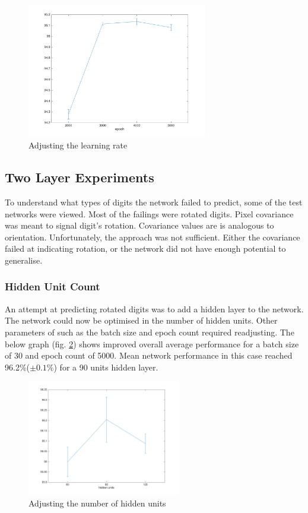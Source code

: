 \documentclass[11]{article}
\begin{document}
\begin{figure}[h]
\centering
\includegraphics[width=0.7\textwidth]{normalised.png}
\caption{Adjusting the learning rate}
\label{fig:normalised}
\end{figure}

\subsection{Two Layer Experiments}

To understand what types of digits the network failed to predict, some of the test networks were viewed.  Most of the failings were rotated digits. Pixel covariance was meant to signal digit's rotation.  Covariance values are is analogous to orientation. Unfortunately, the approach was not sufficient. Either the covariance failed at indicating rotation, or the network did not have enough potential to generalise. 

\subsubsection{Hidden Unit Count}

An attempt at predicting rotated digits was to add a hidden layer to the network. The network could now be optimised in the number of hidden units. Other parameters of such as the batch size and epoch count required readjusting. The below graph (fig. \ref{fig:hiddenunits}) shows improved overall average performance for a batch size of 30 and epoch count of 5000.  Mean network performance in this case reached 96.2\%($\pm 0.1\%$) for a 90 units hidden layer. 
\begin{figure}[h]
\centering
\includegraphics[width=0.6\textwidth]{hiddenunits.png}
\caption{Adjusting the number of hidden units}
\label{fig:hiddenunits}
\end{figure}
\end{document}
